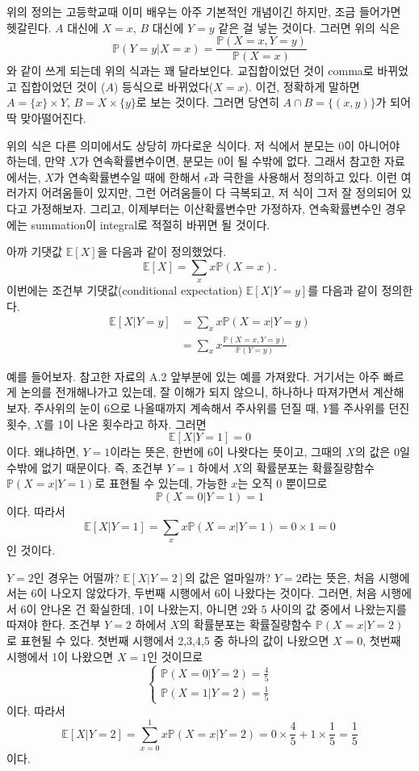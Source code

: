 \documentclass{article}
\begin{document}
위의 정의는 고등학교때 이미 배우는 아주 기본적인 개념이긴 하지만, 조금 들어가면 헷갈린다.
\(A\) 대신에 \(X=x\), \(B\) 대신에 \(Y=y\) 같은 걸 넣는 것이다.
그러면 위의 식은
\[\mathbb P(Y=y|X=x)=\frac{\mathbb P(X=x, Y=y)}{\mathbb P(X=x)}\]
와 같이 쓰게 되는데 위의 식과는 꽤 달라보인다.
교집합이었던 것이 comma로 바뀌었고 집합이었던 것이 (\(A\)) 등식으로 바뀌었다(\(X=x\)).
이건, 정확하게 말하면 \(A=\{x\}\times Y\), \(B=X\times\{y\}\)로 보는 것이다.
그러면 당연히 \(A\cap B=\{(x,y)\}\)가 되어 딱 맞아떨어진다.

위의 식은 다른 의미에서도 상당히 까다로운 식이다.
저 식에서 분모는 0이 아니어야 하는데, 만약 \(X\)가 연속확률변수이면, 분모는 0이 될 수밖에 없다.
그래서 참고한 자료에서는, \(X\)가 연속확률변수일 때에 한해서 \(\epsilon\)과 극한을 사용해서 정의하고 있다.
이런 여러가지 어려움들이 있지만, 그런 어려움들이 다 극복되고, 저 식이 그저 잘 정의되어 있다고 가정해보자.
그리고, 이제부터는 이산확률변수만 가정하자, 연속확률변수인 경우에는 summation이 integral로 적절히 바뀌면 될 것이다.

아까 기댓값 \(\mathbb E[X]\)을 다음과 같이 정의했었다.
\[\mathbb E[X]=\sum_x x\mathbb P(X=x).\]
이번에는 조건부 기댓값(conditional expectation) \(\mathbb E[X|Y=y]\)를 다음과 같이 정의한다.
\begin{align*}
\mathbb E[X|Y=y]
&=\sum_xx\mathbb P(X=x|Y=y)\\
&=\sum_xx\frac{\mathbb P(X=x, Y=y)}{\mathbb P(Y=y)}
\end{align*}

예를 들어보자.
참고한 자료의 A.2 앞부분에 있는 예를 가져왔다.
거기서는  아주 빠르게 논의를 전개해나가고 있는데, 잘 이해가 되지 않으니, 하나하나 따져가면서 계산해보자.
주사위의 눈이 6으로 나올때까지 계속해서 주사위를 던질 때, \(Y\)를 주사위를 던진 횟수, \(X\)를 1이 나온 횟수라고 하자.
그러면
\[\mathbb E[X|Y=1]=0\]
이다.
왜냐하면, \(Y=1\)이라는 뜻은, 한번에 6이 나왓다는 뜻이고, 그때의 \(X\)의 값은 0일 수밖에 없기 때문이다.
즉, 조건부 \(Y=1\) 하에서 \(X\)의 확률분포는 확률질량함수 \(\mathbb P(X=x|Y=1)\)로 표현될 수 있는데, 가능한 \(x\)는 오직 0 뿐이므로
\[\mathbb P(X=0|Y=1)=1\]
이다.
따라서
\[\mathbb E[X|Y=1]=\sum_xx\mathbb P(X=x|Y=1)=0\times1=0\]
인 것이다.

\(Y=2\)인 경우는 어떨까?
\(\mathbb E[X|Y=2]\)의 값은 얼마일까?
\(Y=2\)라는 뜻은, 처음 시행에서는 6이 나오지 않았다가, 두번째 시행에서 6이 나왔다는 것이다.
그러면, 처음 시행에서 6이 안나온 건 확실한데, 1이 나왔는지, 아니면 2와 5 사이의 값 중에서 나왔는지를 따져야 한다.
조건부 \(Y=2\) 하에서 \(X\)의 확률분포는 확률질량함수 \(\mathbb P(X=x|Y=2)\)로 표현될 수 있다.
첫번째 시행에서 2,3,4,5 중 하나의 값이 나왔으면 \(X=0\), 첫번째 시행에서 1이 나왔으면 \(X=1\)인 것이므로
\[\begin{cases}
\mathbb P(X=0|Y=2)=\frac45\\
\mathbb P(X=1|Y=2)=\frac15
\end{cases}\]
이다.
따라서
\[\mathbb E[X|Y=2]=\sum_{x=0}^1x\mathbb P(X=x|Y=2)=0\times\frac45+1\times\frac15=\frac15\]
이다.
\end{document}
